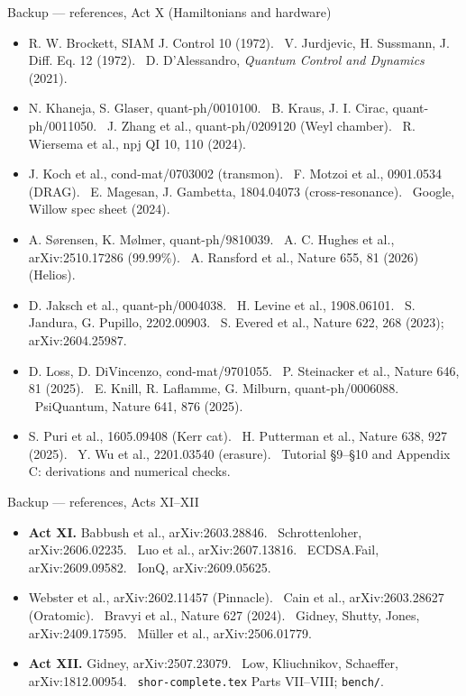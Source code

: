 \documentclass[aspectratio=169,11pt]{beamer}
\begin{document}
\begin{frame}{Backup --- references, Act X (Hamiltonians and hardware)}
  \footnotesize
  \begin{itemize}\setlength{\itemsep}{1.2mm}
    \item R. W. Brockett, SIAM J. Control 10 (1972). \ V. Jurdjevic, H. Sussmann, J. Diff. Eq. 12 (1972). \ D. D'Alessandro, \emph{Quantum Control and Dynamics} (2021).
    \item N. Khaneja, S. Glaser, quant-ph/0010100. \ B. Kraus, J. I. Cirac, quant-ph/0011050. \ J. Zhang et al., quant-ph/0209120 (Weyl chamber). \ R. Wiersema et al., npj QI 10, 110 (2024).
    \item J. Koch et al., cond-mat/0703002 (transmon). \ F. Motzoi et al., 0901.0534 (DRAG). \ E. Magesan, J. Gambetta, 1804.04073 (cross-resonance). \ Google, Willow spec sheet (2024).
    \item A. S{\o}rensen, K. M{\o}lmer, quant-ph/9810039. \ A. C. Hughes et al., arXiv:2510.17286 (99.99\%). \ A. Ransford et al., Nature 655, 81 (2026) (Helios).
    \item D. Jaksch et al., quant-ph/0004038. \ H. Levine et al., 1908.06101. \ S. Jandura, G. Pupillo, 2202.00903. \ S. Evered et al., Nature 622, 268 (2023); arXiv:2604.25987.
    \item D. Loss, D. DiVincenzo, cond-mat/9701055. \ P. Steinacker et al., Nature 646, 81 (2025). \ E. Knill, R. Laflamme, G. Milburn, quant-ph/0006088. \ PsiQuantum, Nature 641, 876 (2025).
    \item S. Puri et al., 1605.09408 (Kerr cat). \ H. Putterman et al., Nature 638, 927 (2025). \ Y. Wu et al., 2201.03540 (erasure). \ Tutorial \S9--\S10 and Appendix C: derivations and numerical checks.
  \end{itemize}
\end{frame}

\begin{frame}{Backup --- references, Acts XI--XII}
  \footnotesize
  \begin{itemize}\setlength{\itemsep}{1.2mm}
    \item \textbf{Act XI.} Babbush et al., arXiv:2603.28846. \ Schrottenloher, arXiv:2606.02235. \ Luo et al., arXiv:2607.13816. \ ECDSA.Fail, arXiv:2609.09582. \ IonQ, arXiv:2609.05625.
    \item Webster et al., arXiv:2602.11457 (Pinnacle). \ Cain et al., arXiv:2603.28627 (Oratomic). \ Bravyi et al., Nature 627 (2024). \ Gidney, Shutty, Jones, arXiv:2409.17595. \ Müller et al., arXiv:2506.01779.
    \item \textbf{Act XII.} Gidney, arXiv:2507.23079. \ Low, Kliuchnikov, Schaeffer, arXiv:1812.00954. \ \texttt{shor-complete.tex} Parts VII--VIII; \texttt{bench/}.
  \end{itemize}
\end{frame}
\end{document}
